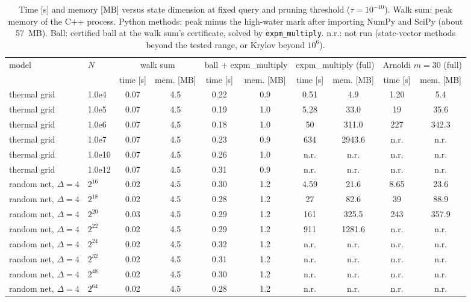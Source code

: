 \documentclass[aps,pra,superscriptaddress,floatfix,longbibliography,twocolumn]{revtex4-2}
\begin{document}
\begin{table}[t]
\footnotesize\setlength{\tabcolsep}{4pt}
\caption{Time [s] and memory [MB] versus state dimension at fixed query and pruning threshold ($\tau=10^{-10}$). Walk sum: peak memory of the C++ process. Python methods: peak minus the high-water mark after importing NumPy and SciPy (about 57~MB). Ball: certified ball at the walk sum's certificate, solved by \texttt{expm\_multiply}. n.r.: not run (state-vector methods beyond the tested range, or Krylov beyond $10^6$).}\label{tab:scaling}
\begin{ruledtabular}
\begin{tabular}{ll|cc|cc|cc|cc}
model & $N$ & \multicolumn{2}{c|}{walk sum} & \multicolumn{2}{c|}{ball + expm\_multiply} & \multicolumn{2}{c|}{expm\_multiply (full)} & \multicolumn{2}{c}{Arnoldi $m=30$ (full)}\\
 & & time [s] & mem. [MB] & time [s] & mem. [MB] & time [s] & mem. [MB] & time [s] & mem. [MB]\\\hline
thermal grid & 1.0e4 & 0.07 & 4.5 & 0.22 & 0.9 & 0.51 & 4.9 & 1.20 & 5.4 \\
thermal grid & 1.0e5 & 0.07 & 4.5 & 0.19 & 1.0 & 5.28 & 33.0 & 19 & 35.6 \\
thermal grid & 1.0e6 & 0.07 & 4.5 & 0.18 & 1.0 & 50 & 311.0 & 227 & 342.3 \\
thermal grid & 1.0e7 & 0.07 & 4.5 & 0.23 & 0.9 & 634 & 2943.6 & n.r. & n.r. \\
thermal grid & 1.0e10 & 0.07 & 4.5 & 0.26 & 1.0 & n.r. & n.r. & n.r. & n.r. \\
thermal grid & 1.0e12 & 0.07 & 4.5 & 0.31 & 0.9 & n.r. & n.r. & n.r. & n.r. \\
random net, $\Delta=4$ & $2^{16}$ & 0.02 & 4.5 & 0.30 & 1.2 & 4.59 & 21.6 & 8.65 & 23.6 \\
random net, $\Delta=4$ & $2^{18}$ & 0.02 & 4.5 & 0.28 & 1.2 & 27 & 82.6 & 39 & 88.9 \\
random net, $\Delta=4$ & $2^{20}$ & 0.03 & 4.5 & 0.29 & 1.2 & 161 & 325.5 & 243 & 357.9 \\
random net, $\Delta=4$ & $2^{22}$ & 0.02 & 4.5 & 0.29 & 1.2 & 911 & 1281.6 & n.r. & n.r. \\
random net, $\Delta=4$ & $2^{24}$ & 0.02 & 4.5 & 0.32 & 1.2 & n.r. & n.r. & n.r. & n.r. \\
random net, $\Delta=4$ & $2^{32}$ & 0.02 & 4.5 & 0.31 & 1.2 & n.r. & n.r. & n.r. & n.r. \\
random net, $\Delta=4$ & $2^{48}$ & 0.02 & 4.5 & 0.30 & 1.2 & n.r. & n.r. & n.r. & n.r. \\
random net, $\Delta=4$ & $2^{64}$ & 0.02 & 4.5 & 0.28 & 1.2 & n.r. & n.r. & n.r. & n.r. \\
\end{tabular}
\end{ruledtabular}
\end{table}
\end{document}
